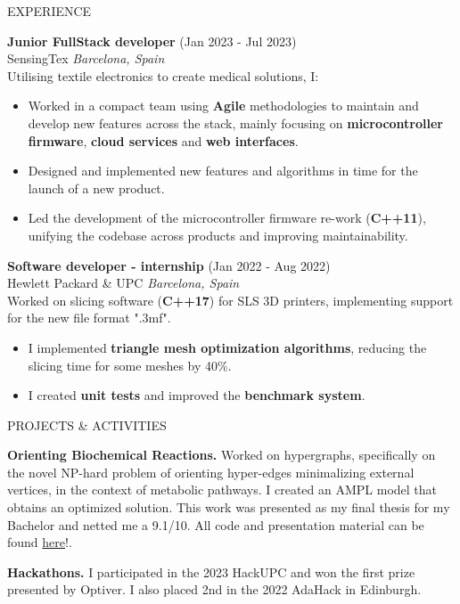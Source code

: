\documentclass{resume} %
\begin{document}
\begin{rSection}{EXPERIENCE}

\textbf{Junior FullStack developer} \hfill (Jan 2023 - Jul 2023)\\
SensingTex \hfill \textit{Barcelona, Spain}\\
Utilising textile electronics to create medical solutions, I:
\begin{itemize}
    \itemsep -3pt {} 
     \item Worked in a compact team using {\bf Agile} methodologies to maintain and develop new features across the stack, mainly focusing on {\bf microcontroller firmware}, {\bf cloud services} and {\bf web interfaces}.
     \item Designed and implemented new features and algorithms in time for the launch of a new product.
     \item Led the development of the microcontroller firmware re-work ({\bf C++11}), unifying the codebase across products and improving maintainability.
\end{itemize}
 
\textbf{Software developer - internship} \hfill (Jan 2022 - Aug 2022)\\
Hewlett Packard \& UPC \hfill \textit{Barcelona, Spain}\\
Worked on slicing software ({\bf C++17}) for SLS 3D printers, implementing support for the new file format ".3mf".
 \begin{itemize}
     \itemsep -3pt {} 
      \item I implemented {\bf triangle mesh optimization algorithms}, reducing the slicing time for some meshes by 40\%.
      \item I created {\bf unit tests} and improved the {\bf benchmark system}.
     \end{itemize}

\end{rSection} 


\begin{rSection}{PROJECTS \& ACTIVITIES}
    \vspace{-1.25em}
    \item \textbf{Orienting Biochemical Reactions.} {
            Worked on hypergraphs, specifically on the novel NP-hard problem of orienting hyper-edges minimalizing external vertices, in the context of metabolic pathways. 
            I created an AMPL model that obtains an optimized solution. 
            This work was presented as my final thesis for my Bachelor and netted me a 9.1/10. 
            All code and presentation material can be found \href{https://github.com/ZephyrSV/tfg_python}{here}!.
        }
    \item \textbf{Hackathons.} {
        I participated in the 2023 HackUPC and won the first prize presented by Optiver.
        I also placed 2nd in the 2022 AdaHack in Edinburgh.
    }
\end{rSection} 
\end{document}
